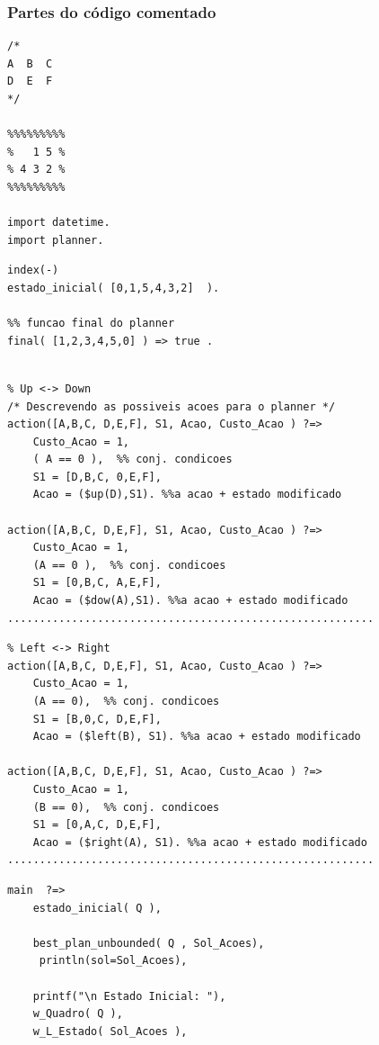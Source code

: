 \begin{frame}[fragile, allowframebreaks=0.9]
 \frametitle{Partes do  código comentado}

\begin{verbatim}
/*
A  B  C 
D  E  F
*/

%%%%%%%%%
%   1 5 %
% 4 3 2 %
%%%%%%%%%

import datetime.
import planner.
\end{verbatim}
\framebreak

\begin{verbatim}
index(-)
estado_inicial( [0,1,5,4,3,2]  ).

%% funcao final do planner
final( [1,2,3,4,5,0] ) => true .


\end{verbatim}
\framebreak

\begin{verbatim}
% Up <-> Down
/* Descrevendo as possiveis acoes para o planner */
action([A,B,C, D,E,F], S1, Acao, Custo_Acao ) ?=>
    Custo_Acao = 1,
    ( A == 0 ),  %% conj. condicoes
    S1 = [D,B,C, 0,E,F], 
    Acao = ($up(D),S1). %%a acao + estado modificado

action([A,B,C, D,E,F], S1, Acao, Custo_Acao ) ?=>
    Custo_Acao = 1,
    (A == 0 ),  %% conj. condicoes
    S1 = [0,B,C, A,E,F],
    Acao = ($dow(A),S1). %%a acao + estado modificado
.........................................................
\end{verbatim}
\framebreak


\begin{verbatim}
% Left <-> Right
action([A,B,C, D,E,F], S1, Acao, Custo_Acao ) ?=>
    Custo_Acao = 1,
    (A == 0),  %% conj. condicoes
    S1 = [B,0,C, D,E,F],
    Acao = ($left(B), S1). %%a acao + estado modificado
    
action([A,B,C, D,E,F], S1, Acao, Custo_Acao ) ?=>
    Custo_Acao = 1,
    (B == 0),  %% conj. condicoes
    S1 = [0,A,C, D,E,F],
    Acao = ($right(A), S1). %%a acao + estado modificado
.........................................................
\end{verbatim}

\framebreak

\begin{footnotesize}
\begin{verbatim}
main  ?=>  
    estado_inicial( Q ),
   
    best_plan_unbounded( Q , Sol_Acoes), 
     println(sol=Sol_Acoes),
        
    printf("\n Estado Inicial: "),
    w_Quadro( Q ), 
    w_L_Estado( Sol_Acoes ), 
  

\end{verbatim}
\end{footnotesize}
\end{frame}
